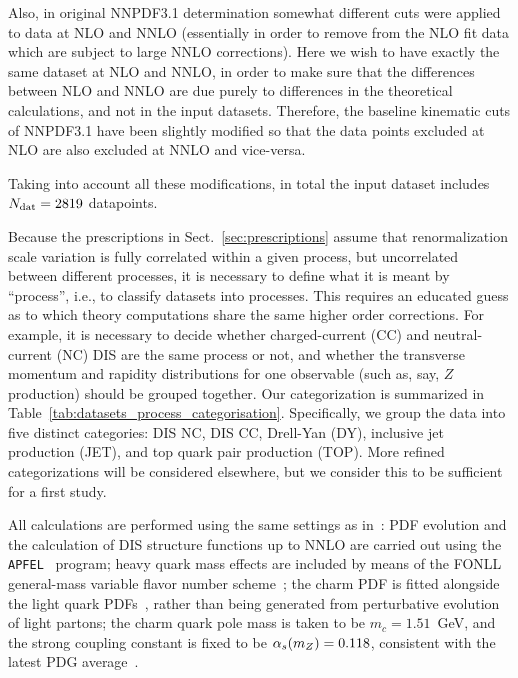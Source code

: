Also, in original NNPDF3.1 determination
somewhat different cuts were applied to data at
NLO and NNLO (essentially in order to remove from the NLO fit data
which are subject to large NNLO corrections). Here we wish to have
exactly the same dataset at NLO and NNLO, in order to make sure that 
the differences between NLO and NNLO are due purely to differences in 
the theoretical calculations, and not in the input datasets. Therefore, the
baseline kinematic cuts of NNPDF3.1 have been slightly
modified so that the data points excluded at NLO are also excluded at NNLO
and vice-versa.

Taking into account all these modifications,  in total
the input dataset includes $N_{\rm dat}=2819$ datapoints.

Because the prescriptions in
Sect.~\ref{sec:prescriptions} assume that
renormalization scale variation is fully correlated within a given
process, but uncorrelated between different processes, it is necessary
to define what it is meant by ``process'', i.e., to classify
datasets into processes. This requires an educated
guess as to which theory computations share the same higher order
corrections. For example, it is necessary to decide whether
charged-current (CC) and neutral-current (NC) DIS are the
same process or not, and whether the transverse momentum
and rapidity distributions for one observable (such as, say, $Z$
production) should be grouped together.
Our categorization is summarized in Table~\ref{tab:datasets_process_categorisation}.
%
Specifically, we group the data into five distinct categories: DIS NC, DIS CC, Drell-Yan (DY), inclusive jet
production (JET), and top quark pair production (TOP). More refined
categorizations will be considered elsewhere, but we consider this to
be sufficient for a first study. 

All calculations are performed using 
the same settings as in~\cite{Ball:2017nwa}:
%
PDF evolution and the calculation of DIS structure functions up to NNLO
are carried out using the {\tt APFEL}~\cite{Bertone:2013vaa} program;
%
heavy quark mass effects are included by means of the FONLL general-mass variable
flavor number scheme~\cite{Forte:2010ta,Ball:2015dpa,Ball:2015tna}; 
the charm PDF is fitted alongside the light quark PDFs~\cite{Ball:2016neh}, 
rather than being generated from perturbative evolution of light 
partons; the charm quark pole mass is taken to be $m_c=1.51$~GeV,
%
and the strong coupling constant is fixed to be $\alpha_s(m_Z) = 0.118$, consistent
with the latest PDG average~\cite{Olive:2016xmw}.

